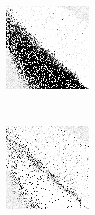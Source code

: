 \begin{figure}
\center

	\begin{subfigure}[t]{0.22\textwidth}
		\includegraphics[width=\textwidth]{images/findings/round1/strategies_handmaxmin_pone.png}
		\caption{\handmaxmin}
	\end{subfigure}
	~
	\begin{subfigure}[t]{0.22\textwidth}
		\includegraphics[width=\textwidth]{images/findings/round1/strategies_handmaxavg_pone.png}

\end{subfigure}
\end{figure}

